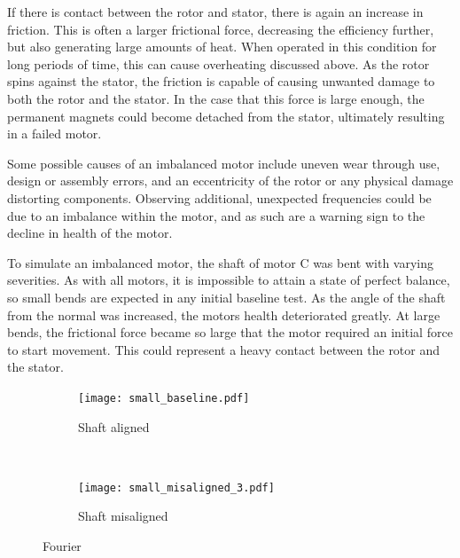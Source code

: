 If there is contact between the rotor and stator, there is again an increase in friction. This is often a larger frictional force, decreasing the efficiency further, but also generating large amounts of heat. When operated in this condition for long periods of time, this can cause overheating discussed above. As the rotor spins against the stator, the friction is capable of causing unwanted damage to both the rotor and the stator. In the case that this force is large enough, the permanent magnets could become detached from the stator, ultimately resulting in a failed motor.

Some possible causes of an imbalanced motor include uneven wear through use, design or assembly errors, and an eccentricity of the rotor or any physical damage distorting components. Observing additional, unexpected frequencies could be due to an imbalance within the motor, and as such are a warning sign to the decline in health of the motor. 


To simulate an imbalanced motor, the shaft of motor C was bent with varying severities. 
As with all motors, it is impossible to attain a state of perfect balance, so small bends are expected in any initial baseline test. As the angle of the shaft from the normal was increased, the motors health deteriorated greatly. At large bends, the frictional force became so large that the motor required an initial force to start movement. This could represent a heavy contact between the rotor and the stator. 

\begin{figure}[t!]
    \centering
    \begin{subfigure}[t]{0.5\textwidth}
        \centering
        \texttt{[image: small\_baseline.pdf]}
        \caption{Shaft aligned}
    \end{subfigure}%
    ~ 
    \begin{subfigure}[t]{0.5\textwidth}
        \centering
        \texttt{[image: small\_misaligned\_3.pdf]}
        \caption{Shaft misaligned}
    \end{subfigure}
    \caption[Fourier Plot Misaligned Shaft]{Fourier }
\end{figure}

